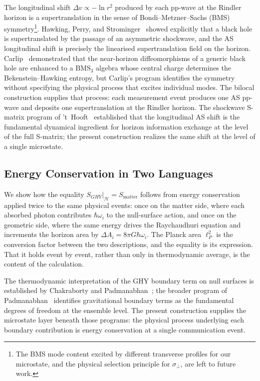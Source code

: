 \documentclass[12pt,a4paper]{article}
\begin{document}
The longitudinal shift $\Delta v \propto -\ln r^2$ produced 
by each  pp-wave at the Rindler horizon is a supertranslation 
in the sense of Bondi--Metzner--Sachs (BMS) symmetry\footnote{
The BMS mode content excited 
by different transverse profiles for our microstate, and the physical 
selection principle for $\sigma_\perp$, are left to 
future work.}. 
Hawking, Perry, and Strominger~\cite{hawking2016soft} showed 
explicitly that a black hole is supertranslated by the passage 
of an asymmetric shockwave, and the AS longitudinal shift is 
precisely the linearised supertranslation field on the horizon. 
Carlip~\cite{carlip2018black} demonstrated that the near-horizon 
diffeomorphisms of a generic black hole are enhanced to a 
$\mathrm{BMS}_3$ algebra whose central charge determines the 
Bekenstein--Hawking entropy, but Carlip's program identifies the 
symmetry without specifying the physical process that excites 
individual modes. The bilocal construction supplies that process: 
each measurement event produces one AS pp-wave and deposits 
one supertranslation at the Rindler horizon. The shockwave 
S-matrix program of 't~Hooft~\cite{hooft1996scattering} 
established that the longitudinal AS shift is the fundamental 
dynamical ingredient for horizon information exchange at the 
level of the full S-matrix; the present construction realizes 
the same shift at the level of a single microstate.


\subsection{Energy Conservation in Two Languages}
\label{sec:microstate_action}
We show how the equality $S_{GHY}|_{\mathcal{H}} = S_{\mathrm{matter}}$ 
follows from energy conservation applied twice to the same 
physical events: once on the matter side, where each absorbed 
photon contributes $\hbar\omega_i$ to the null-surface action, 
and once on the geometric side, where the same energy drives 
the Raychaudhuri equation and increments the horizon area by 
$\Delta A_i = 8\pi G\hbar\omega_i$. The Planck area $\ell_P^2$ 
is the conversion factor between the two descriptions, and the 
equality is its expression. That it holds event by event, rather 
than only in thermodynamic average, is the content of the 
calculation.

The thermodynamic interpretation of the GHY boundary term 
on null surfaces is established by Chakraborty and 
Padmanabhan~\cite{chakraborty2020boundary}; the broader 
program of Padmanabhan~\cite{padmanabhan2010thermodynamical} 
identifies gravitational boundary terms as the fundamental 
degrees of freedom at the ensemble level. The present 
construction supplies the microstate layer beneath those 
programs: the physical process underlying each boundary 
contribution is energy conservation at a single 
communication event.
\end{document}
